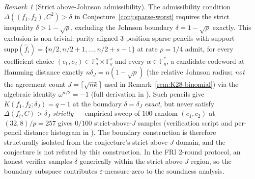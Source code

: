 \documentclass[11pt]{article}
\theoremstyle{definition}
\theoremstyle{remark}
\newtheorem{remark}[theorem]{Remark}
\newcommand{\FF}{\mathbb{F}}
\begin{document}
\begin{remark}[Strict above-Johnson admissibility]
\label{rem:sparse-worst-boundary}
The admissibility condition $\Delta((f_1, f_2), C^2) > \delta$ in
Conjecture~\ref{conj:sparse-worst} requires the strict inequality
$\delta > 1 - \sqrt{\rho}$, excluding the Johnson boundary
$\delta = 1 - \sqrt{\rho}$ exactly. This exclusion is non-trivial:
parity-aligned $3$-position sparse pencils with support
$\mathrm{supp}(\hat f_i) = \{n/2, n/2{+}1, \ldots, n/2{+}s{-}1\}$ at
rate $\rho = 1/4$ admit, for every coefficient choice
$(c_1, c_2) \in \FF_q^s \times \FF_q^s$ and every $\alpha \in \FF_q^*$,
a candidate codeword at Hamming distance exactly
$n \delta_J = n(1 - \sqrt{\rho})$ (the relative Johnson radius;
\emph{not} the agreement count $J = \lceil\sqrt{nk}\rceil$ used in
Remark~\ref{rem:K28-binomial}) via the algebraic identity
$\omega^{n/2} = -1$ (full derivation in \cite{CompanionRepo}). Such pencils give $K(f_1, f_2; \delta_J) = q - 1$ at
the boundary $\delta = \delta_J$ \emph{exact}, but never satisfy
$\Delta(f_i, C) > \delta_J$ \emph{strictly} --- empirical sweep of $100$
random $(c_1, c_2)$ at $(32, 8) / p = 257$ gives $0/100$ strict-above-$J$
samples (verification script and per-pencil distance histogram in
\cite{CompanionRepo}). The boundary construction is therefore
structurally isolated from the conjecture's strict above-$J$ domain,
and the conjecture is not refuted by this construction. In the FRI
2-round protocol, an honest verifier samples $\delta$ generically
within the strict above-$J$ region, so the boundary subspace contributes
$\varepsilon$-measure-zero to the soundness analysis.
\end{remark}
\end{document}
